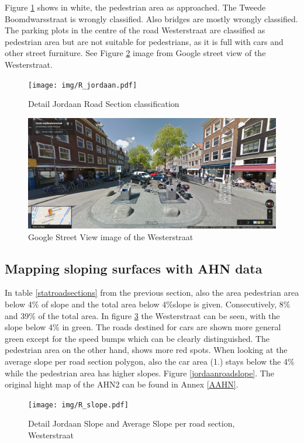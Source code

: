 Figure \ref{jordaanroad} shows in white, the pedestrian area as approached. The Tweede Boomdwarsstraat is wrongly classified. Also bridges are mostly wrongly classified. The parking plots in the centre of the road Westerstraat are classified as pedestrian area but are not suitable for pedestrians, as it is full with cars and other street furniture. See Figure \ref{westerstraat} image from Google street view of the Westerstraat. 

\begin{figure}[h]
\texttt{[image: img/R\_jordaan.pdf]}
\centering
\caption{
Detail Jordaan Road Section classification\label{jordaanroad}}
\end{figure} 

\begin{figure}[h]
\includegraphics[width=\textwidth]{img/R_Westerstraat.png}
\centering
\caption{
Google Street View image of the Westerstraat\label{westerstraat}}
\end{figure} 


\clearpage

\subsection{Mapping sloping surfaces with AHN data}
In table \ref{statroadsections} from the previous section, also the area pedestrian area below 4\% of slope and the total area below 4\%slope is given. Consecutively, 8\% and 39\% of the total area.
In figure \ref{jordaanslope} the Westerstraat can be seen, with the slope below 4\% in green. The roads destined for cars are shown more general green except for the speed bumps which can be clearly distinguished. The pedestrian area on the other hand, shows more red spots. When looking at the average slope per road section polygon, also the car area (1.) stays below the 4\% while the pedestrian area has higher slopes. Figure \ref{jordaanroadslope}.
The original hight map of the AHN2 can be found in Annex \ref{AAHN}.
\begin{figure}[h]
\texttt{[image: img/R\_slope.pdf]}
\centering
\caption{
Detail Jordaan Slope and Average Slope per road section, Westerstraat\label{jordaanslope}}
\end{figure} 

